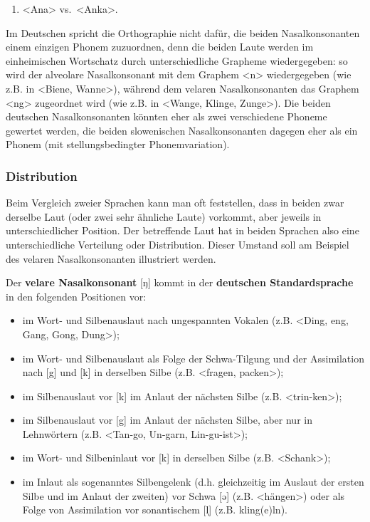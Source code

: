 \documentclass[
]{article}
\providecommand{\tightlist}{%
  \setlength{\itemsep}{0pt}\setlength{\parskip}{0pt}}
\begin{document}
\begin{enumerate}
\def\labelenumi{(\arabic{enumi})}
\setcounter{enumi}{12}
\tightlist
\item
  \textless Ana\textgreater{} vs.~\textless Anka\textgreater.
\end{enumerate}

Im Deutschen spricht die Orthographie nicht dafür, die beiden
Nasalkonsonanten einem einzigen Phonem zuzuordnen, denn die beiden Laute
werden im einheimischen Wortschatz durch unterschiedliche Grapheme
wiedergegeben: so wird der alveolare Nasalkonsonant mit dem Graphem
\textless n\textgreater{} wiedergegeben (wie z.B. in \textless Biene, Wanne\textgreater), während dem velaren
Nasalkonsonanten das Graphem \textless ng\textgreater{} zugeordnet wird (wie z.B. in
\textless Wange, Klinge, Zunge\textgreater). Die beiden deutschen Nasalkonsonanten könnten
eher als zwei verschiedene Phoneme gewertet werden, die beiden
slowenischen Nasalkonsonanten dagegen eher als ein Phonem (mit
stellungsbedingter Phonemvariation).

\hypertarget{distribution}{%
\subsubsection{Distribution}\label{distribution}}

Beim Vergleich zweier Sprachen kann man oft feststellen, dass in beiden
zwar derselbe Laut (oder zwei sehr ähnliche Laute) vorkommt, aber
jeweils in unterschiedlicher Position. Der betreffende Laut hat in
beiden Sprachen also eine unterschiedliche Verteilung oder Distribution.
Dieser Umstand soll am Beispiel des velaren Nasalkonsonanten illustriert
werden.

Der \textbf{velare Nasalkonsonant} {[}ŋ{]} kommt in der \textbf{deutschen
Standardsprache} in den folgenden Positionen vor:

\begin{itemize}
\item
  im Wort- und Silbenauslaut nach ungespannten Vokalen (z.B. \textless Ding,
  eng, Gang, Gong, Dung\textgreater);
\item
  im Wort- und Silbenauslaut als Folge der Schwa-Tilgung und der
  Assimilation nach {[}g{]} und {[}k{]} in derselben Silbe (z.B. \textless fragen,
  packen\textgreater);
\item
  im Silbenauslaut vor {[}k{]} im Anlaut der nächsten Silbe (z.B.
  \textless trin-ken\textgreater);
\item
  im Silbenauslaut vor {[}g{]} im Anlaut der nächsten Silbe, aber nur in
  Lehnwörtern (z.B. \textless Tan-go, Un-garn, Lin-gu-ist\textgreater);
\item
  im Wort- und Silbeninlaut vor {[}k{]} in derselben Silbe (z.B.
  \textless Schank\textgreater);
\item
  im Inlaut als sogenanntes Silbengelenk (d.h. gleichzeitig im Auslaut
  der ersten Silbe und im Anlaut der zweiten) vor Schwa {[}ə{]} (z.B.
  \textless hängen\textgreater) oder als Folge von Assimilation vor sonantischem {[}l̩{]}
  (z.B. kling(e)ln).
\end{itemize}
\end{document}
